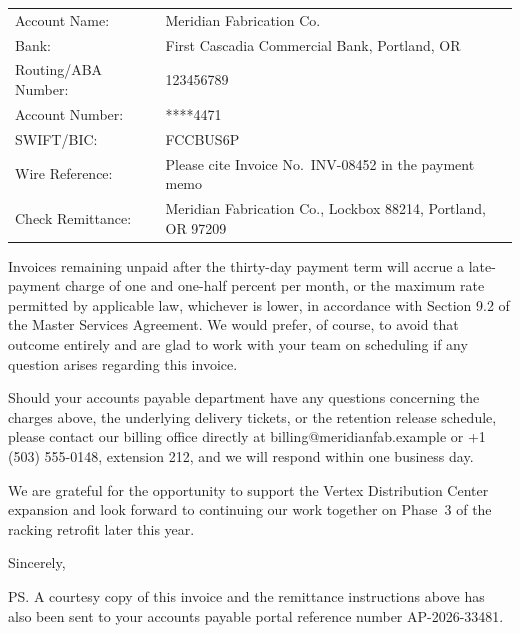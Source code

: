 \documentclass[11pt,a4paper,addressstd]{dinbrief}
\begin{document}
\begin{letter}
\begin{tcolorbox}[
  colback=paleSteel,
  colframe=meridianGold,
  boxrule=0.8pt,
  arc=1.5mm,
  left=4mm,right=4mm,top=2.5mm,bottom=2.5mm,
  colbacktitle=meridianGold,
  coltitle=white,
  fonttitle=\sffamily\bfseries,
  title=Remittance Instructions
]
\begin{tabular}{@{}lp{8.6cm}@{}}
Account Name: & Meridian Fabrication Co.\\
Bank: & First Cascadia Commercial Bank, Portland, OR\\
Routing/ABA Number: & 123456789\\
Account Number: & ****4471\\
SWIFT/BIC: & FCCBUS6P\\
Wire Reference: & Please cite Invoice No.\ INV-08452 in the payment memo\\
Check Remittance: & Meridian Fabrication Co., Lockbox 88214, Portland, OR 97209\\
\end{tabular}
\end{tcolorbox}

Invoices remaining unpaid after the thirty-day payment term will accrue a
late-payment charge of one and one-half percent per month, or the maximum
rate permitted by applicable law, whichever is lower, in accordance with
Section 9.2 of the Master Services Agreement. We would prefer, of course,
to avoid that outcome entirely and are glad to work with your team on
scheduling if any question arises regarding this invoice.

Should your accounts payable department have any questions concerning the
charges above, the underlying delivery tickets, or the retention release
schedule, please contact our billing office directly at
billing@meridianfab.example or +1 (503) 555-0148, extension 212, and we will
respond within one business day.

We are grateful for the opportunity to support the Vertex Distribution Center
expansion and look forward to continuing our work together on Phase~3 of the
racking retrofit later this year.

\closing{Sincerely,}



\ps{A courtesy copy of this invoice and the remittance instructions above has
also been sent to your accounts payable portal reference number
AP-2026-33481.}

\end{letter}
\end{document}
